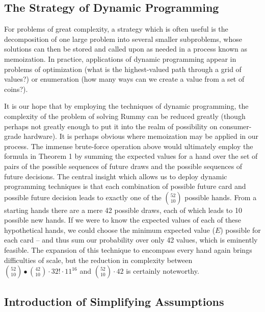 \documentclass[letter,12pt]{article}
\begin{document}
\subsection{The Strategy of Dynamic Programming}

For problems of great complexity, a strategy which is often useful is the decomposition of one large problem into several smaller subproblems, whose solutions can then be stored and called upon as needed in a process known as memoization. In practice, applications of dynamic programming appear in problems of optimization (what is the highest-valued path through a grid of values?) or enumeration (how many ways can we create a value from a set of coins?). 

It is our hope that by employing the techniques of dynamic programming, the complexity of the problem of solving Rummy can be reduced greatly (though perhaps not greatly enough to put it into the realm of possibility on consumer-grade hardware). It is perhaps obvious where memoization may be applied in our process. The immense brute-force operation above would ultimately employ the formula in Theorem 1 by summing the expected values for a hand over the set of pairs of the possible sequences of future draws and the possible sequences of future decisions. The central insight which allows us to deploy dynamic programming techniques is that each combination of possible future card and possible future decision leads to exactly one of the $\binom{52}{10}$ possible hands. From a starting hands there are a mere 42 possible draws, each of which leads to 10 possible new hands. If we were to know the expected values of each of these hypothetical hands, we could choose the minimum expected value ($E$) possible for each card – and thus sum our probability over only 42 values, which is eminently feasible. The expansion of this technique to encompass every hand again brings difficulties of scale, but the reduction in complexity between $\binom{52}{10}∙\binom{42}{10} \cdot 32! \cdot 11^{16}$ and $\binom{52}{10}\cdot42$ is certainly noteworthy.

\subsection{Introduction of Simplifying Assumptions}
\end{document}

